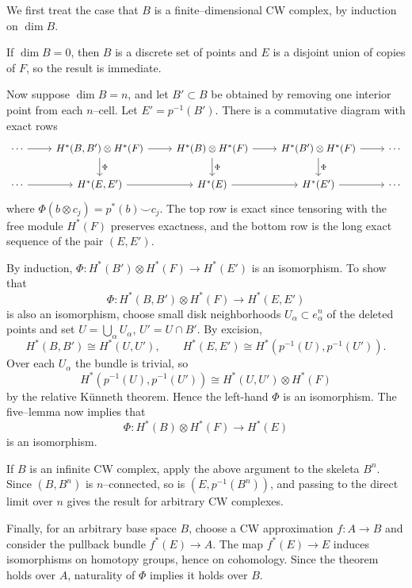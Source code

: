 \documentclass[12pt]{article}  %
\begin{document}
\begin{solution}
We first treat the case that $B$ is a finite--dimensional CW complex,
by induction on $\dim B$.

If $\dim B=0$, then $B$ is a discrete set of points and $E$ is a disjoint
union of copies of $F$, so the result is immediate.

Now suppose $\dim B=n$, and let $B'\subset B$ be obtained by removing
one interior point from each $n$--cell.  Let $E'=p^{-1}(B')$.
There is a commutative diagram with exact rows
\[
\begin{tikzcd}
\cdots \arrow[r] &
H^*(B,B')\otimes H^*(F) \arrow[r] \arrow[d,"\Phi"] &
H^*(B)\otimes H^*(F) \arrow[r] \arrow[d,"\Phi"] &
H^*(B')\otimes H^*(F) \arrow[r] \arrow[d,"\Phi"] &
\cdots \\
\cdots \arrow[r] &
H^*(E,E') \arrow[r] &
H^*(E) \arrow[r] &
H^*(E') \arrow[r] &
\cdots
\end{tikzcd}
\]
where $\Phi(b\otimes c_j)=p^*(b)\smile c_j$.
The top row is exact since tensoring with the free module $H^*(F)$
preserves exactness, and the bottom row is the long exact sequence
of the pair $(E,E')$.

By induction, $\Phi:H^*(B')\otimes H^*(F)\to H^*(E')$ is an isomorphism.
To show that \[\Phi:H^*(B,B')\otimes H^*(F)\to H^*(E,E')\]
is also an isomorphism, choose small disk neighborhoods
$U_\alpha\subset e^n_\alpha$ of the deleted points and set
$U=\bigcup_\alpha U_\alpha$, $U'=U\cap B'$.
By excision,
\[
H^*(B,B')\cong H^*(U,U'),
\qquad
H^*(E,E')\cong H^*(p^{-1}(U),p^{-1}(U')).
\]
Over each $U_\alpha$ the bundle is trivial, so
\[
H^*(p^{-1}(U),p^{-1}(U'))
\cong
H^*(U,U')\otimes H^*(F)
\]
by the relative Künneth theorem.
Hence the left-hand $\Phi$ is an isomorphism.
The five--lemma now implies that
\[
\Phi:H^*(B)\otimes H^*(F)\longrightarrow H^*(E)
\]
is an isomorphism.

If $B$ is an infinite CW complex, apply the above argument
to the skeleta $B^n$.
Since $(B,B^n)$ is $n$--connected,
so is $(E,p^{-1}(B^n))$,
and passing to the direct limit over $n$ gives the result
for arbitrary CW complexes.

Finally, for an arbitrary base space $B$, choose a CW approximation
$f:A\to B$ and consider the pullback bundle $f^*(E)\to A$.
The map $f^*(E)\to E$ induces isomorphisms on homotopy groups,
hence on cohomology.
Since the theorem holds over $A$, naturality of $\Phi$
implies it holds over $B$.

\end{solution}
\end{document}
